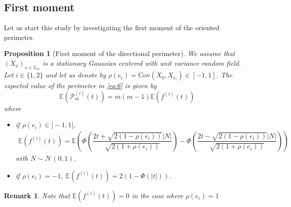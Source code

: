 \documentclass[12pt]{article}
\theoremstyle{Theorem}
\newtheorem{Proposition}[Theorem]{Proposition}
\newtheorem{remark}{Remark}
\begin{document}
\subsection{First moment}
Let us start this study by investigating the first moment of the oriented perimeter.
\begin{Proposition}[First moment of the directional perimeter] 
\label{propFisrtmoment}
We assume that $\left(X_x \right)_{x \in \mathbb{G}_{m}}$ is a stationary Gaussian centered with unit variance random field. Let $i \in \{1,2\}$ and let us denote by  $\rho(e_i) = \text{Cov}\left(X_{\scriptscriptstyle 0}, X_{e_i}\right) \in [-1, 1]$. The expected value of the perimeter in \eqref{eq:6} is  given by $$\mathbb{E}\left(\mathcal{P}_{m}^{\scriptscriptstyle (i)}(t)\right) = m(m-1)\mathbb{E}\left(f^{(i)}(t) \right)$$ where
\begin{itemize}
  \item if $\rho(e_{i}) \in ]-1,1]$, 
    {\small
  \begin{align}
  \label{propEquationFisrtmoment}
  \mathbb{E}\left(f^{(i)}(t) \right) = \mathbb{E}\left(\Phi\left(\dfrac{2t + \sqrt{2(1-\rho(e_i))}|N|}{\sqrt{2(1+\rho(e_i))}}\right)  - \Phi\left(\dfrac{2t - \sqrt{2(1-\rho(e_i))}|N|}{\sqrt{2(1+\rho(e_i))}}\right)\right)
  \end{align}}
with $N \sim \mathcal{N}(0,1)$. 
\item if $\rho(e_i) = -1, \; \mathbb{E}\left(f^{(i)}(t) \right)= 2\left(1 - \Phi\left(|t|\right)\right).$
  \end{itemize}
\end{Proposition}
\begin{remark}
Note that $\mathbb{E}\left(f^{(i)}(t) \right) = 0$ in the case where $\rho(e_i) = 1$ 
\end{remark}
\end{document}
